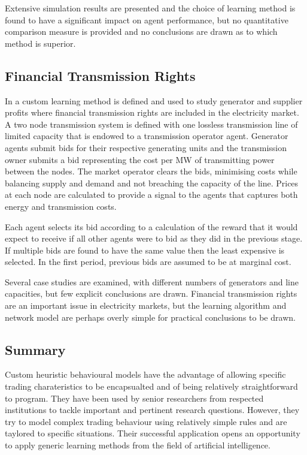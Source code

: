 Extensive simulation results are presented and the choice of learning method is
found to have a significant impact on agent performance, but no quantitative
comparison measure is provided and no conclusions are drawn as to which method
is superior.

\subsection{Financial Transmission Rights}
In  a custom learning method is defined and used to study
generator and supplier profits where financial transmission rights are included
in the electricity market.  A two node transmission system is defined with one
lossless transmission line of limited capacity that is endowed to a transmission
operator agent.  Generator agents submit bids for their respective generating
units and the transmission owner submits a bid representing the cost per MW of
transmitting power between the nodes.  The market operator clears the bids,
minimising costs while balancing supply and demand and not breaching the
capacity of the line.  Prices at each node are calculated to provide a signal to
the agents that captures both energy and transmission costs.


Each agent selects its bid according to a calculation of the reward that it
would expect to receive if all other agents were to bid as they did in the
previous stage.  If multiple bids are found to have the same value then the
least expensive is selected.  In the first period, previous bids are assumed to
be at marginal cost.

Several case studies are examined, with different numbers of generators and
line capacities, but few explicit conclusions are drawn.  Financial transmission
rights are an important issue in electricity markets, but the learning algorithm
and network model are perhaps overly simple for practical conclusions to be
drawn.

\subsection{Summary}
Custom heuristic behavioural models have the advantage of allowing specific
trading charateristics to be encapsualted and of being relatively
straightforward to program. They have been used by senior researchers from
respected institutions to tackle important and pertinent research
questions. However, they try to model complex trading behaviour using relatively
simple rules and are taylored to specific situations. Their successful
application opens an opportunity to apply generic learning methods from
the field of artificial intelligence.

